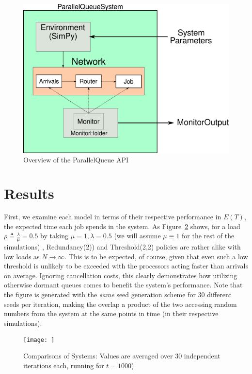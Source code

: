 \begin{figure}
    \centering
    \includegraphics[scale=0.7]{pq}
    \caption{Overview of the ParallelQueue API}
    \label{fig:API}
\end{figure}


\section{Results}\label{sec:results}
First, we examine each model in terms of their respective performance in $E(T)$, the expected time each job spends in the system.
As Figure~\ref{fig:img} shows, for a load $\rho \triangleq \frac{\lambda}{\mu} = 0.5$ by taking $\mu=1, \lambda = 0.5$ (we will assume $\mu \equiv 1$ for the
rest of the simulations) , Redundancy(2)) and Threshold(2,2) policies are rather alike with low loads as $N \rightarrow \infty$. This is to be expected, of course, given that even such a low threshold is unlikely to be exceeded with the processors acting faster than arrivals on average. Ignoring cancellation costs, this clearly demonstrates how utilizing otherwise dormant queues comes to benefit the system's performance. Note that the figure is generated with the \textit{same} seed generation scheme for 30 different seeds per iteration, making the overlap a product of the two accessing random numbers from the system at the same points in time (in their respective simulations).

\begin{figure}
    \centering
    \texttt{[image: ]} %
    \caption{Comparisons of Systems: Values are averaged over 30 independent iterations each, running for $t=1000$)}
    \label{fig:img}
\end{figure}

